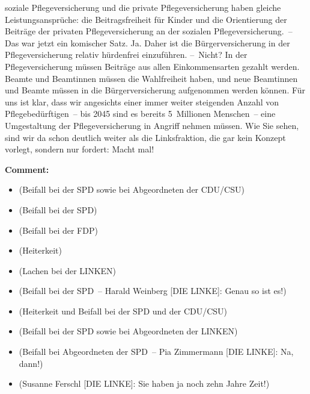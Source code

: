 \documentclass{article}
\begin{document}
soziale Pflegeversicherung und die private Pflegeversicherung haben gleiche Leistungsansprüche: die Beitragsfreiheit für Kinder und die Orientierung der Beiträge der privaten Pflegeversicherung an der sozialen Pflegeversicherung. – Das war jetzt ein komischer Satz.  Ja.  Daher ist die Bürgerversicherung in der Pflegeversicherung relativ hürdenfrei einzuführen.  – Nicht? In der Pflegeversicherung müssen Beiträge aus allen Einkommensarten gezahlt werden. Beamte und Beamtinnen müssen die Wahlfreiheit haben, und neue Beamtinnen und Beamte müssen in die Bürgerversicherung aufgenommen werden können. Für uns ist klar, dass wir angesichts einer immer weiter steigenden Anzahl von Pflegebedürftigen – bis 2045 sind es bereits 5 Millionen Menschen – eine Umgestaltung der Pflegeversicherung in Angriff nehmen müssen. Wie Sie sehen, sind wir da schon deutlich weiter als die Linksfraktion, die gar kein Konzept vorlegt,  sondern nur fordert: Macht mal!  

\noindent\textbf{Comment:}
\begin{itemize}
    \setlength\itemsep{-3pt}
    \item (Beifall bei der SPD sowie bei Abgeordneten der CDU/CSU)
    \setlength\itemsep{-3pt}
    \item (Beifall bei der SPD)
    \setlength\itemsep{-3pt}
    \item (Beifall bei der FDP)
    \setlength\itemsep{-3pt}
    \item (Heiterkeit)
    \setlength\itemsep{-3pt}
    \item (Lachen bei der LINKEN)
    \setlength\itemsep{-3pt}
    \item (Beifall bei der SPD – Harald Weinberg [DIE LINKE]: Genau so ist es!)
    \setlength\itemsep{-3pt}
    \item (Heiterkeit und Beifall bei der SPD und der CDU/CSU)
    \setlength\itemsep{-3pt}
    \item (Beifall bei der SPD sowie bei Abgeordneten der LINKEN)
    \setlength\itemsep{-3pt}
    \item (Beifall bei Abgeordneten der SPD – Pia Zimmermann [DIE LINKE]: Na, dann!)
    \setlength\itemsep{-3pt}
    \item (Susanne Ferschl [DIE LINKE]: Sie haben ja noch zehn Jahre Zeit!)
\end{itemize}
\end{document}
